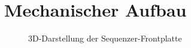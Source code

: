 \section{Mechanischer Aufbau}
\begin{figure}[h]
	\centering
	\setlength{\fboxsep}{1pt} %
	\setlength{\fboxrule}{1pt} %
	\caption{3D-Darstellung der Sequenzer-Frontplatte}
	\label{fig:Frontplatte_SEQ}
\end{figure}
\FloatBarrier
